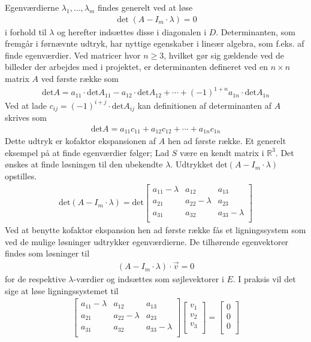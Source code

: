 Egenværdierne $\lambda_1,\ldots, \lambda_m$ findes generelt ved at løse
\begin{align*}
\det(A - I_m \cdot \lambda ) = 0
\end{align*}
i forhold til $\lambda$ og herefter indsættes disse i diagonalen i $D$. Determinanten, som fremgår i førnævnte udtryk, har nyttige egenskaber i lineær algebra, som f.eks. af finde egenværdier. Ved matricer hvor $n \geq 3$, hvilket gør sig gældende ved de billeder der arbejdes med i projektet, er determinanten defineret ved en $n \times n$ matrix $A$ ved første række som
\begin{align*}
\textrm{det}A=a_{11}\cdot \textrm{det}A_{11} - a_{12} \cdot \textrm{det}A_{12}+\cdots +(-1)^{1+n}a_{1n}\cdot \textrm{det}A_{1n}
\end{align*}
Ved at lade $c_{ij} = (-1)^{i+j}\cdot\textrm{det}A_{ij}$ kan definitionen af determinanten af $A$ skrives som
\begin{align*}
\textrm{det}A=a_{11}c_{11}+a_{12}c_{12}+\cdots+a_{1n}c_{1n}
\end{align*}
Dette udtryk er kofaktor ekspansionen af $A$ hen ad første række.
Et generelt eksempel på at finde egenværdier følger; Lad $S$ være en kendt matrix i $\mathbb{R}^3$. Det ønskes at finde løsningen til den ubekendte $\lambda$. Udtrykket $\textrm{det}(A - I_m \cdot \lambda )$ opstilles.
\begin{align*}
\textrm{det}(A - I_m \cdot \lambda) = \text{det}\begin{bmatrix}
a_{11} - \lambda & a_{12} & a_{13}\\
a_{21} & a_{22} - \lambda & a_{23}\\
a_{31} & a_{32} & a_{33} - \lambda\\
\end{bmatrix}
\end{align*}
Ved at benytte kofaktor ekspansion hen ad første række fås et ligningssystem som ved de mulige løsninger udtrykker egenværdierne. 
De tilhørende egenvektorer findes som løsninger til
\begin{align*}
(A - I_m \cdot \lambda) \cdot \vec{v} = 0
\end{align*} for de respektive $\lambda$-værdier og indsættes som søjlevektorer i $E$. I praksis vil det sige at løse ligningssystemet til
\begin{align*}
\begin{bmatrix}
a_{11} - \lambda & a_{12} & a_{13}\\
a_{21} & a_{22} - \lambda & a_{23}\\
a_{31} & a_{32} & a_{33} - \lambda\\
\end{bmatrix}
\begin{bmatrix}
v_{1} \\
v_{2} \\
v_{3} \\
\end{bmatrix}=
\begin{bmatrix}
0\\0\\0\\
\end{bmatrix}
\end{align*}
